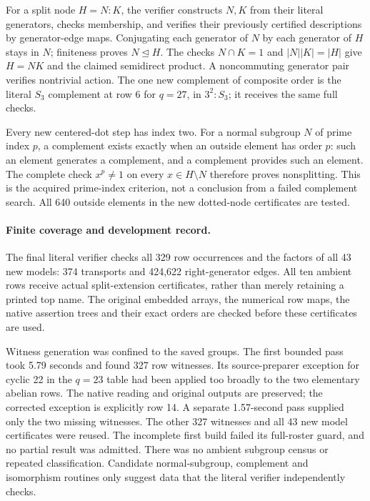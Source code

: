 \documentclass[11pt]{article}
\begin{document}
For a split node $H=N:K$, the verifier constructs $N,K$ from their literal
generators, checks membership, and verifies their previously certified
descriptions by generator-edge maps. Conjugating each generator of $N$ by
each generator of $H$ stays in $N$; finiteness proves $N\trianglelefteq H$.
The checks $N\cap K=1$ and $|N||K|=|H|$ give $H=NK$ and the claimed
semidirect product. A noncommuting generator pair verifies nontrivial action.
The one new complement of composite order is the literal $S_3$ complement
at row 6 for $q=27$, in $3^2:S_3$; it receives the same full checks.

Every new centered-dot step has index two. For a normal subgroup $N$ of
prime index $p$, a complement exists exactly when an outside element has
order $p$: such an element generates a complement, and a complement
provides such an element. The complete check $x^p\ne1$ on every
$x\in H\setminus N$ therefore proves nonsplitting. This is the acquired
prime-index criterion, not a conclusion from a failed complement search.
All 640 outside elements in the new dotted-node certificates are tested.

\newpage
\paragraph{Finite coverage and development record.}
The final literal verifier checks all 329 row occurrences and the factors
of all 43 new models: 374 transports and 424,622 right-generator edges.
All ten ambient rows receive actual split-extension certificates, rather
than merely retaining a printed top name. The original embedded arrays,
the numerical row maps, the native assertion trees and their exact orders
are checked before these certificates are used.

Witness generation was confined to the saved groups. The first bounded
pass took 5.79 seconds and found 327 row witnesses. Its source-preparer
exception for cyclic 22 in the $q=23$ table had been applied too broadly
to the two elementary abelian rows. The native reading and original
outputs are preserved; the corrected exception is explicitly row 14.
A separate 1.57-second pass supplied only the two missing witnesses.
The other 327 witnesses and all 43 new model certificates were reused.
The incomplete first build failed its full-roster guard, and no partial
result was admitted. There was no ambient subgroup census or repeated
classification. Candidate normal-subgroup, complement and isomorphism
routines only suggest data that the literal verifier independently checks.
\end{document}
